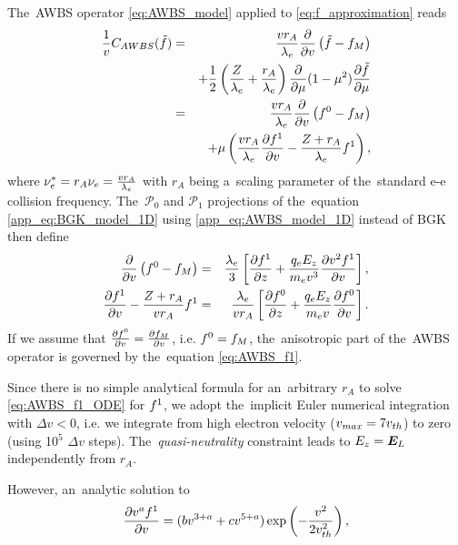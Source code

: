 The~AWBS operator \eqref{eq:AWBS_model} applied to 
\eqref{eq:f_approximation} reads
\begin{eqnarray}
  \frac{1}{v}C_{AWBS}(\tilde{f})
  &=& 
  \frac{v r_A}{\lambda_e} \frac{\partial{}}{\partial{v}}\left(\tilde{f} - f_M\right) 
  \nonumber \\
  && + \frac{1}{2}\left(\frac{Z}{\lambda_e} + \frac{r_A}{\lambda_e}\right)
  \frac{\partial{}}{\partial{\mu}}(1 - \mu^2)\frac{\partial{\tilde{f}}}{\partial{\mu}}  \nonumber \\
  &=& \frac{v r_A}{\lambda_e} \frac{\partial{}}{\partial{v}}\left(f^0 - f_M\right) \nonumber \\ 
  &&\, + \mu\left(\frac{v r_A}{\lambda_e} \frac{\partial{f^1}}{\partial{v}} 
  - \frac{Z+r_A}{\lambda_e}f^1\right) ,
  \label{app_eq:AWBS_model_1D}
\end{eqnarray}
where $\nu_{e}^* = r_A \nu_{e} = \frac{v r_A}{\lambda_e}$ with $r_A$ being a~scaling
parameter of the~standard e-e collision frequency. 
The~$\mathcal{P}_0$ and $\mathcal{P}_1$ projections 
of the~equation \eqref{app_eq:BGK_model_1D} using 
\eqref{app_eq:AWBS_model_1D} instead of BGK then define
\begin{eqnarray}
  \frac{\partial{}}{\partial{v}}\left( f^0 -f_M\right) &=& 
  \frac{\lambda_e}{3}\left[\frac{\partial{f^1}}{\partial{z}} +
  \frac{q_eE_z}{m_ev^3}\frac{\partial{v^2f^1}}{\partial{v}}\right] ,
  \label{app_eq:AWBS_f0} \\
  \frac{\partial{f^1}}{\partial{v}} 
  - \frac{Z + r_A}{{v r_A}}f^1 &=& \frac{\lambda_e}{v r_A}
  \left[\frac{\partial{f^0}}{\partial{z}} + \frac{q_eE_z}{m_ev}\frac{\partial{f^0}}{\partial{v}}\right] 
  .
  \label{app_eq:AWBS_f1} 
\end{eqnarray}
If we assume that $\frac{\partial{f^0}}{\partial{v}} = \frac{\partial{f_M}}{\partial{v}}$, i.e. $f^0 = f_M$,
the~anisotropic part of the~AWBS operator is governed by the~equation
\eqref{eq:AWBS_f1}.

Since there is no simple analytical formula for an~arbitrary $r_A$
to solve \eqref{eq:AWBS_f1_ODE} for $f^1$, we adopt the~implicit Euler 
numerical integration with $\Delta v < 0$, i.e. we integrate from high 
electron velocity ($v_{max} = 7v_{th}$) to zero  
(using 10$^5$ $\Delta v$ steps). The~\textit{quasi-neutrality} constraint
leads to $E_z = \boldsymbol{E}_L$ independently from $r_A$.

However, an~analytic solution to
\begin{equation}
  \frac{\partial{v^a f^1}}{\partial{v}} = (b v^{3+a} + c v^{5+a}) 
  \exp\left(-\frac{v^2}{2v_{th}^2}\right)
  ,
  \nonumber
\end{equation}

